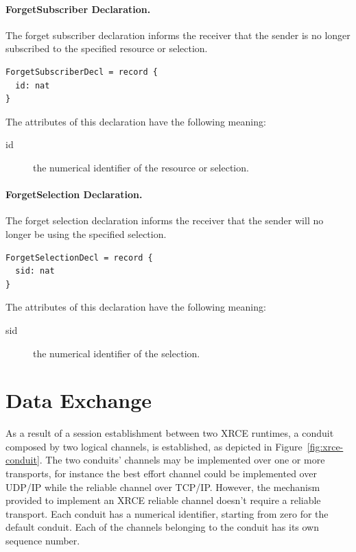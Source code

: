 \documentclass[a4paper,oneside,article]{memoir}
\begin{document}
\paragraph{ForgetSubscriber Declaration.} The forget subscriber declaration informs the receiver
that the sender is no longer subscribed to the specified resource or selection.
\begin{verbatim}
ForgetSubscriberDecl = record {
  id: nat
}
\end{verbatim}
The attributes of this declaration have the following meaning:
\begin{description}
\item[id] the numerical identifier of the resource or selection.
\end{description}

\paragraph{ForgetSelection Declaration.} The forget selection declaration informs the receiver that
the sender will no longer be using the specified selection.
\begin{verbatim}
ForgetSelectionDecl = record {
  sid: nat
}
\end{verbatim}
The attributes of this declaration have the following meaning:
\begin{description}
\item[sid] the numerical identifier of the selection.
\end{description}


\section{Data Exchange}

As a result of a session establishment between two XRCE runtimes, a conduit composed by two logical
channels, is established, as depicted in Figure~\ref{fig:xrce-conduit}.  The two conduits’ channels
may be implemented over one or more transports, for instance the best effort channel could be
implemented over UDP/IP while the reliable channel over TCP/IP\@.  However, the mechanism provided
to implement an XRCE reliable channel doesn’t require a reliable transport.  Each conduit has a
numerical identifier, starting from zero for the default conduit.  Each of the channels belonging to
the conduit has its own sequence number.
\end{document}

